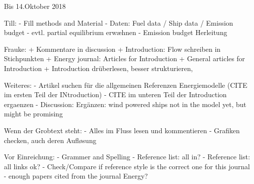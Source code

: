 Bis 14.Oktober 2018

Till:
- Fill methods and Material
- Daten: Fuel data / Ship data / Emission budget
- evtl. partial equilibrium erwæhnen
- Emission budget Herleitung

Frauke:
+ Kommentare in discussion
+ Introduction: Flow schreiben in Stichpunkten
+ Energy journal: Articles for Introduction
+ General articles for Introduction
+ Introduction drüberlesen, besser strukturieren, 

Weiteres:
- Artikel suchen für die allgemeinen Referenzen Energiemodelle (CITE im ersten Teil der INtroduction)
- CITE im unteren Teil der Introduction ergaenzen
- Discussion: Ergänzen: wind powered ships not in the model yet, but might be promising

Wenn der Grobtext steht:
- Alles im Fluss lesen und kommentieren
- Grafiken checken, auch deren Aufløsung


Vor Einreichung:
- Grammer and Spelling
- Reference list: all in?
- Reference list: all links ok?
- Check/Compare if reference style is the correct one for this journal
- enough papers cited from the journal Energy?
